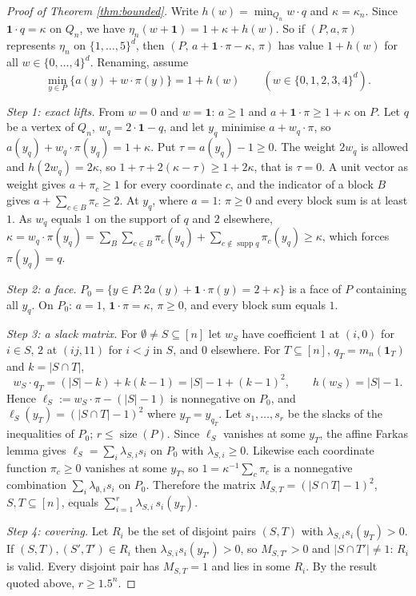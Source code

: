 \documentclass[11pt]{amsart}
\theoremstyle{plain}
\theoremstyle{definition}
\theoremstyle{remark}
\newcommand{\one}{\mathbf{1}}
\newcommand{\size}{\operatorname{size}}
\begin{document}
\begin{proof}[Proof of Theorem \ref{thm:bounded}]
Write $h(w)=\min_{Q_n}w\cdot q$ and $\kappa=\kappa_n$. Since $\one\cdot q=\kappa$ on $Q_n$, we have
$\eta_n(w+\one)=1+\kappa+h(w)$. So if $(P,a,\pi)$ represents $\eta_n$ on $\{1,\dots,5\}^d$, then
$(P,\,a+\one\cdot\pi-\kappa,\,\pi)$ has value $1+h(w)$ for all $w\in\{0,\dots,4\}^d$. Renaming, assume
\begin{equation}\label{eq:rep04}
 \min_{y\in P}\{a(y)+w\cdot\pi(y)\}=1+h(w)\qquad(w\in\{0,1,2,3,4\}^d).
\end{equation}

\emph{Step 1: exact lifts.} From $w=0$ and $w=\one$: $a\ge1$ and $a+\one\cdot\pi\ge1+\kappa$ on $P$. Let $q$ be a
vertex of $Q_n$, $w_q=2\cdot\one-q$, and let $y_q$ minimise $a+w_q\cdot\pi$, so $a(y_q)+w_q\cdot\pi(y_q)=1+\kappa$.
Put $\tau=a(y_q)-1\ge0$. The weight $2w_q$ is allowed and $h(2w_q)=2\kappa$, so
$1+\tau+2(\kappa-\tau)\ge1+2\kappa$, that is $\tau=0$. A unit vector as weight gives $a+\pi_c\ge1$ for every
coordinate $c$, and the indicator of a block $B$ gives $a+\sum_{c\in B}\pi_c\ge2$. At $y_q$, where $a=1$: $\pi\ge0$
and every block sum is at least $1$. As $w_q$ equals $1$ on the support of $q$ and $2$ elsewhere,
$\kappa=w_q\cdot\pi(y_q)=\sum_B\sum_{c\in B}\pi_c(y_q)+\sum_{c\notin\operatorname{supp}q}\pi_c(y_q)\ge\kappa$, which
forces $\pi(y_q)=q$.

\emph{Step 2: a face.} $P_0=\{y\in P:2a(y)+\one\cdot\pi(y)=2+\kappa\}$ is a face of $P$ containing all $y_q$. On
$P_0$: $a=1$, $\one\cdot\pi=\kappa$, $\pi\ge0$, and every block sum equals $1$.

\emph{Step 3: a slack matrix.} For $\emptyset\ne S\subseteq[n]$ let $w_S$ have coefficient $1$ at $(i,0)$ for
$i\in S$, $2$ at $(ij,11)$ for $i<j$ in $S$, and $0$ elsewhere. For $T\subseteq[n]$, $q_T=m_n(\one_T)$ and
$k=|S\cap T|$,
\[
 w_S\cdot q_T=(|S|-k)+k(k-1)=|S|-1+(k-1)^2,\qquad h(w_S)=|S|-1 .
\]
Hence $\ell_S:=w_S\cdot\pi-(|S|-1)$ is nonnegative on $P_0$, and $\ell_S(y_T)=(|S\cap T|-1)^2$ where $y_T=y_{q_T}$.
Let $s_1,\dots,s_r$ be the slacks of the inequalities of $P_0$; $r\le\size(P)$. Since $\ell_S$ vanishes at some
$y_T$, the affine Farkas lemma gives $\ell_S=\sum_i\lambda_{S,i}s_i$ on $P_0$ with $\lambda_{S,i}\ge0$. Likewise each
coordinate function $\pi_c\ge0$ vanishes at some $y_T$, so $1=\kappa^{-1}\sum_c\pi_c$ is a nonnegative combination
$\sum_i\lambda_{\emptyset,i}s_i$ on $P_0$. Therefore the matrix $M_{S,T}=(|S\cap T|-1)^2$, $S,T\subseteq[n]$, equals
$\sum_{i=1}^r\lambda_{S,i}\,s_i(y_T)$.

\emph{Step 4: covering.} Let $R_i$ be the set of disjoint pairs $(S,T)$ with $\lambda_{S,i}s_i(y_T)>0$. If
$(S,T),(S',T')\in R_i$ then $\lambda_{S,i}s_i(y_{T'})>0$, so $M_{S,T'}>0$ and $|S\cap T'|\ne1$: $R_i$ is valid. Every
disjoint pair has $M_{S,T}=1$ and lies in some $R_i$. By the result quoted above, $r\ge1.5^n$.
\end{proof}
\end{document}

